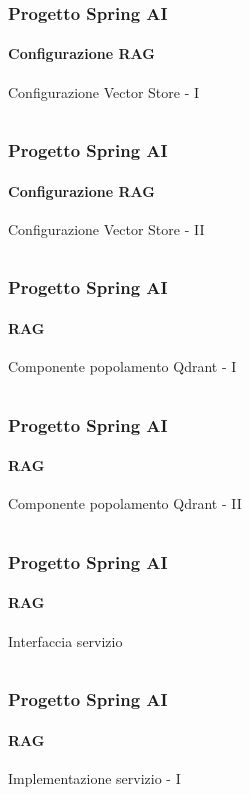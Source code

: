 %
\begin{frame}[t,fragile] \frametitle{Progetto Spring AI}
    \framesubtitle{Configurazione RAG}
        \vspace*{-.7cm}
        \begin{block}{Configurazione Vector Store - I}
			{\tiny\inputminted{java}{code/RAGConfig.java}}
    	\end{block}
\end{frame}
%
\begin{frame}[t,fragile] \frametitle{Progetto Spring AI}
    \framesubtitle{Configurazione RAG}
        \vspace*{-.7cm}
        \begin{block}{Configurazione Vector Store - II}
			{\tiny\inputminted{java}{code/RAGConfig-2.java}}
    	\end{block}
\end{frame}
%
\begin{frame}[t,fragile] \frametitle{Progetto Spring AI}
    \framesubtitle{RAG}
        \vspace*{-.7cm}
        \begin{block}{Componente popolamento Qdrant - I}
			{\tiny\inputminted{java}{code/TextDataLoader.java}}
    	\end{block}
\end{frame}
%
\begin{frame}[t,fragile] \frametitle{Progetto Spring AI}
    \framesubtitle{RAG}
        \vspace*{-.7cm}
        \begin{block}{Componente popolamento Qdrant - II}
			{\tiny\inputminted{java}{code/TextDataLoader-2.java}}
    	\end{block}
\end{frame}
%
\begin{frame}[t,fragile] \frametitle{Progetto Spring AI}
    \framesubtitle{RAG}
        \begin{block}{Interfaccia servizio}
			{\tiny\inputminted{java}{code/RAGService.java}}
    	\end{block}
\end{frame}
%
\begin{frame}[t,fragile] \frametitle{Progetto Spring AI}
    \framesubtitle{RAG}
        \vspace*{-.7cm}
        \begin{block}{Implementazione servizio - I}
			{\tiny\inputminted{java}{code/RAGServiceImpl.java}}
    	\end{block}
\end{frame}
